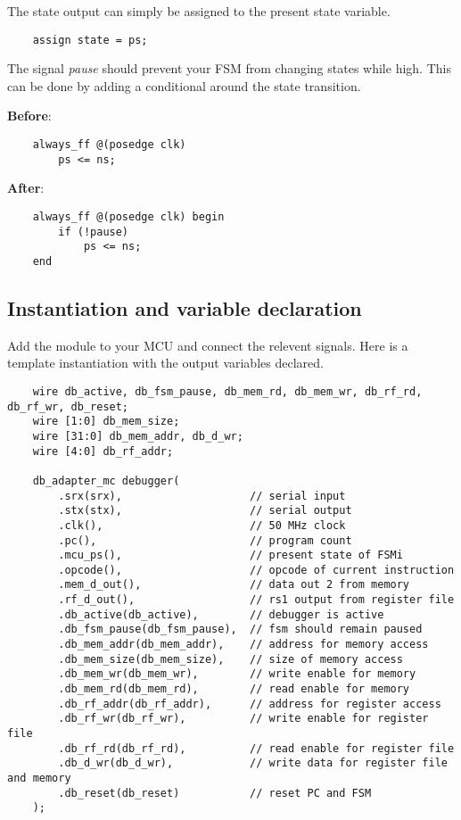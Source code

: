 \documentclass[10pt,a4paper]{article}
\begin{document}
The state output can simply be assigned to the present state variable.

\begin{verbatim}
    assign state = ps;
\end{verbatim}

The signal \emph{pause} should prevent your FSM from changing states while high. This can be done
by adding a conditional around the state transition.

\medskip
\noindent\textbf{Before}:
\begin{verbatim}
    always_ff @(posedge clk)
        ps <= ns;
\end{verbatim}

\noindent\textbf{After}:
\begin{verbatim}
    always_ff @(posedge clk) begin
        if (!pause)
            ps <= ns;
    end
\end{verbatim}

\newpage
\subsection{Instantiation and variable declaration}
Add the module to your MCU and connect the relevent signals. Here is a template instantiation
with the output variables declared.

\begin{verbatim}
    wire db_active, db_fsm_pause, db_mem_rd, db_mem_wr, db_rf_rd, db_rf_wr, db_reset;
    wire [1:0] db_mem_size;
    wire [31:0] db_mem_addr, db_d_wr;
    wire [4:0] db_rf_addr;

    db_adapter_mc debugger(
        .srx(srx),                    // serial input
        .stx(stx),                    // serial output
        .clk(),                       // 50 MHz clock 
        .pc(),                        // program count
        .mcu_ps(),                    // present state of FSMi
        .opcode(),                    // opcode of current instruction
        .mem_d_out(),                 // data out 2 from memory
        .rf_d_out(),                  // rs1 output from register file
        .db_active(db_active),        // debugger is active
        .db_fsm_pause(db_fsm_pause),  // fsm should remain paused
        .db_mem_addr(db_mem_addr),    // address for memory access
        .db_mem_size(db_mem_size),    // size of memory access
        .db_mem_wr(db_mem_wr),        // write enable for memory
        .db_mem_rd(db_mem_rd),        // read enable for memory
        .db_rf_addr(db_rf_addr),      // address for register access
        .db_rf_wr(db_rf_wr),          // write enable for register file
        .db_rf_rd(db_rf_rd),          // read enable for register file
        .db_d_wr(db_d_wr),            // write data for register file and memory
        .db_reset(db_reset)           // reset PC and FSM
    );
\end{verbatim}
\end{document}
